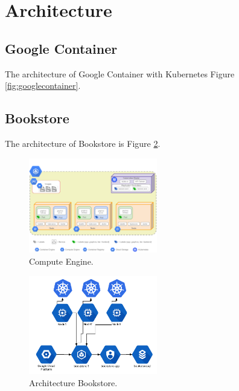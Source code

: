 \documentclass[a4paper]{article}
\begin{document}
\section{Architecture}
\subsection{Google Container}
The architecture of Google Container with Kubernetes Figure \ref{fig:googlecontainer}.


\subsection{Bookstore}
The architecture of Bookstore is 
Figure \ref{fig:bookstore}.

\begin{figure}
\centering
\includegraphics[width=0.5\textwidth]{grapheComputeEngine.png}
\caption{\label{fig:bookstore}Compute Engine.\cite{omerdawelbeit}}
\end{figure}

\begin{figure}
\centering
\includegraphics[width=0.5\textwidth]{bookstore.png}
\caption{\label{fig:bookstore}Architecture Bookstore.}
\end{figure}



\end{document}

